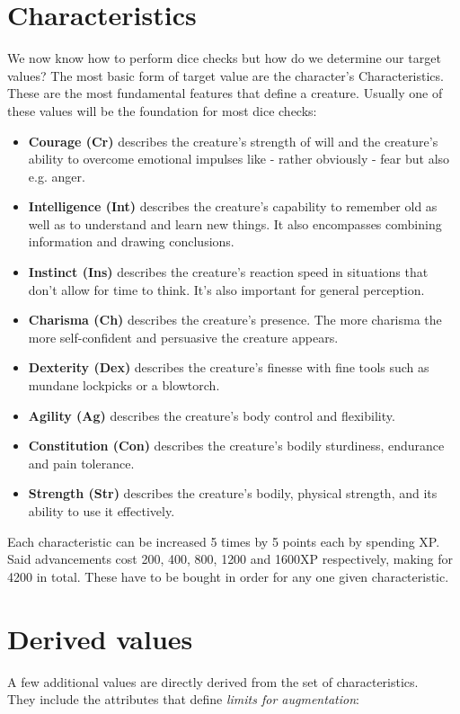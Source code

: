 \documentclass[11pt,a4paper,openany,dvipsnames]{book}
\begin{document}
	\section{Characteristics}
	We now know how to perform dice checks but how do we determine our target values?
	The most basic form of target value are the character’s Characteristics.
	These are the most fundamental features that define a creature.
	Usually one of these values will be the foundation for most dice checks:
	\begin{itemize}
		\setlength\itemsep{-8mm}
		\item \textbf{Courage (Cr)} describes the creature’s strength of will
			and the creature’s ability to overcome emotional impulses like
			- rather obviously - fear but also e.g. anger.
		\item \textbf{Intelligence (Int)} describes the creature’s capability to remember old as well as to understand and learn new things.
			It also encompasses combining information and drawing conclusions.
		\item \textbf{Instinct (Ins)} describes the creature’s reaction speed in situations that don’t allow for time to think.
			It's also important for general perception.
		\item \textbf{Charisma (Ch)} describes the creature’s presence. The more charisma the more self-confident and persuasive the creature appears.
		\item \textbf{Dexterity (Dex)} describes the creature’s finesse with fine tools such as mundane lockpicks or a blowtorch.
		\item \textbf{Agility (Ag)} describes the creature’s body control and flexibility.
		\item \textbf{Constitution (Con)} describes the creature’s bodily sturdiness, endurance and pain tolerance.
		\item \textbf{Strength (Str)} describes the creature’s bodily, physical strength,
			and its ability to use it effectively.
	\end{itemize}
	Each characteristic can be increased 5 times by 5 points each by spending XP. Said advancements cost 200, 400, 800, 1200 and 1600XP respectively, making for 4200 in total. These have to be bought in order for any one given characteristic.

	\section{Derived values}
	A few additional values are directly derived from the set of characteristics. \\
	They include the attributes that define \emph{limits for augmentation}:
\end{document}
